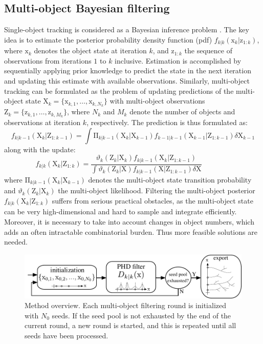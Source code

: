 \subsection{Multi-object Bayesian filtering} 
\label{ssec:multi-obj-bay-filt}
Single-object tracking is considered as a Bayesian inference problem \cite{bar2004estimation, sarkka2013bayesian}. The key idea is to estimate the posterior probability density function (pdf) $f_{k|k}(\mathrm{x}_k | \mathrm{z}_{1:k})$, where $\mathrm{x}_k$ denotes the object state at iteration $k$, and $\mathrm{z}_{1:k}$ the sequence of observations from iterations $1$ to $k$ inclusive. Estimation is accomplished by sequentially applying prior knowledge to predict the state in the next iteration and updating this estimate with available observations. Similarly, multi-object tracking can be formulated as the problem of updating predictions of the multi-object state $\mathrm{X}_k = \{\mathrm{x}_{k,1},\ldots,\mathrm{x}_{k,N_k}\}$ with multi-object observations $\mathrm{Z}_k = \{\mathrm{z}_{k,1},\ldots,\mathrm{z}_{k,M_k}\}$, where $N_k$ and $M_k$ denote the number of objects and observations at iteration $k$, respectively. The prediction is thus formulated as:
\begin{equation}
f_{k|k-1}(\mathrm{X}_k | \mathrm{Z}_{1:k-1}) = 
\int\!\mathrm{\Pi}_{k|k-1}(\mathrm{X}_k | \mathrm{X}_{k-1}) f_{k-1|k-1}(\mathrm{X}_{k-1}|\mathrm{Z}_{1:k-1}) \delta\mathrm{X}_{k-1}
\label{eq:prediction}
\end{equation}
along with the update:
\begin{equation}
f_{k|k}(\mathrm{X}_k|\mathrm{Z}_{1:k}) =
\frac{\vartheta_k(\mathrm{Z}_k|\mathrm{X}_k) f_{k|k-1}(\mathrm{X}_k|\mathrm{Z}_{1:k-1})}{\int\!\vartheta_k(\mathrm{Z}_k|\mathrm{X})f_{k|k-1}(\mathrm{X}|\mathrm{Z}_{1:k-1}) \delta\mathrm{X}}\qquad\qquad
\label{eq:update}
\end{equation}
where $\mathrm{\Pi}_{k|k-1}(\mathrm{X}_k | \mathrm{X}_{k-1})$ denotes the multi-object state transition probability and $\vartheta_k(\mathrm{Z}_k|\mathrm{X}_k)$ the multi-object likelihood. Filtering the multi-object posterior $f_{k|k}(\mathrm{X}_k | \mathrm{Z}_{1:k})$ suffers from serious practical obstacles, as the multi-object state can be very high-dimensional and hard to sample and integrate efficiently. Moreover, it is necessary to take into account changes in object numbers, which adds an often intractable combinatorial burden. Thus more feasible solutions are needed.
\begin{figure}
	\centering
	\includegraphics[width=0.8\linewidth]{fig1}
	\caption{Method overview. Each multi-object filtering round is initialized with $N_0$ seeds. If the seed pool is not exhausted by the end of the current round, a new round is started, and this is repeated until all seeds have been processed.}
	\label{fig1}
\end{figure}
